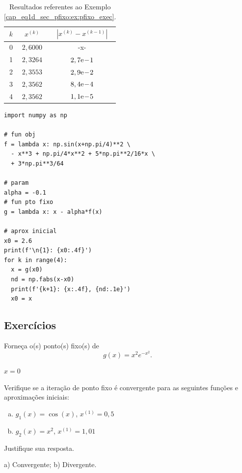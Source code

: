 \begin{ex}
\begin{table}[H]
  \centering
  \caption{Resultados referentes ao Exemplo \ref{cap_eq1d_sec_pfixo:ex:pfixo_exec}.}
  \label{cap_eq1d_sec_pfixo:tab:ex_pfixo_exec}
  \begin{tabular}{r|cc}
    $k$ & $x^{(k)}$ & $|x^{(k)}-x^{(k-1)}|$ \\\hline
    0 & $2,6000$ & -x-\\
    1 & $2,3264$ & $2,7\mathrm{e}\!-\!1$ \\
    2 & $2,3553$ & $2,9\mathrm{e}\!-\!2$ \\
    3 & $2,3562$ & $8,4\mathrm{e}\!-\!4$ \\
    4 & $2,3562$ & $1,1\mathrm{e}\!-\!5$ \\\hline
  \end{tabular}
\end{table}

\begin{lstlisting}
import numpy as np

# fun obj
f = lambda x: np.sin(x+np.pi/4)**2 \
  - x**3 + np.pi/4*x**2 + 5*np.pi**2/16*x \
  + 3*np.pi**3/64

# param
alpha = -0.1
# fun pto fixo
g = lambda x: x - alpha*f(x)

# aprox inicial
x0 = 2.6
print(f'\n{1}: {x0:.4f}')
for k in range(4):
  x = g(x0)
  nd = np.fabs(x-x0)
  print(f'{k+1}: {x:.4f}, {nd:.1e}')
  x0 = x
\end{lstlisting}

\end{ex}

\subsection{Exercícios}

\begin{exer}
  Forneça o(s) ponto(s) fixo(s) de
  \begin{equation}
    g(x) = x^2e^{-x^2}.
  \end{equation}
\end{exer}
\begin{resp}
  $x=0$
\end{resp}

\begin{exer}
  Verifique se a iteração de ponto fixo é convergente para as seguintes funções e aproximações iniciais:
  \begin{enumerate}[a)]
  \item $g_1(x) = \cos(x)$, $x^{(1)} = 0,5$
  \item $g_2(x) = x^2$, $x^{(1)} = 1,01$
  \end{enumerate}
  Justifique sua resposta.
\end{exer}
\begin{resp}
  a) Convergente; b) Divergente.
\end{resp}

